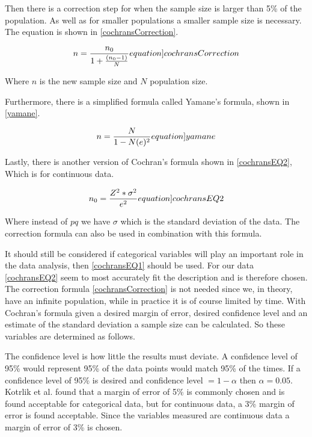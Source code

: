 Then there is a correction step for when the sample size is larger than 5\% of the population. As well as for smaller populations a smaller sample size is necessary.\cite{israel1992determining,kotrlik2001organizational} The equation is shown in \cref{cochransCorrection}.

\begin{equation}
    n = \frac{n_0}{1+\frac{(n_0-1)}{N}}
    \label[equation]{cochransCorrection}
\end{equation}

Where $n$ is the new sample size and $N$ population size.



Furthermore, there is a simplified formula called Yamane's formula, shown in \cref{yamane}\cite{israel1992determining}. 

\begin{equation}
    n = \frac{N}{1 - N(e)^2}
    \label[equation]{yamane}
\end{equation}


Lastly, there is another version of Cochran's formula shown in \cref{cochransEQ2}, Which is for continuous data. 

\begin{equation}
    n_0 = \frac{Z^2*\sigma^2}{e^2}
    \label[equation]{cochransEQ2}
\end{equation}

Where instead of $pq$ we have $\sigma$ which is the standard deviation of the data. The correction formula can also be used in combination with this formula.\nytafsnit



It should still be considered if categorical variables will play an important role in the data analysis, then \cref{cochransEQ1} should be used\cite{kotrlik2001organizational}. For our data \cref{cochransEQ2} seem to most accurately fit the description and is therefore chosen. The correction formula \cref{cochransCorrection} is not needed since we, in theory, have an infinite population, while in practice it is of course limited by time. With Cochran's formula given a desired margin of error, desired confidence level and an estimate of the standard deviation a sample size can be calculated. So these variables are determined as follows. 

The confidence level is how little the results must deviate. A confidence level of 95\% would represent 95\% of the data points would match 95\% of the times. If a confidence level of 95\% is desired and confidence level $= 1 - \alpha$ then $\alpha = 0.05$. 
Kotrlik et al. found that a margin of error of 5\% is commonly chosen and is found acceptable for categorical data, but for continuous data, a 3\% margin of error is found acceptable\cite{kotrlik2001organizational}. Since the variables measured are continuous data a margin of error of 3\% is chosen.

